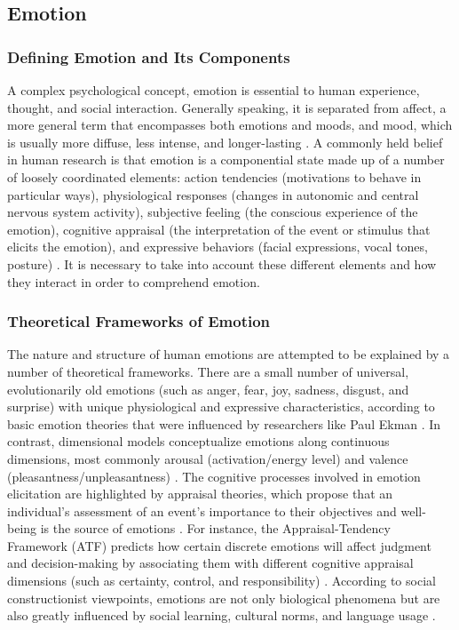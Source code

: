 \documentclass{DESSThesis}
\begin{document}
\subsection{Emotion}

\subsubsection{Defining Emotion and Its Components}
A complex psychological concept, emotion is essential to human experience, thought, and social interaction. Generally speaking, it is separated from affect, a more general term that encompasses both emotions and moods, and mood, which is usually more diffuse, less intense, and longer-lasting \cite{barsade_ripple_2002,lerner_emotion_2015}. A commonly held belief in human research is that emotion is a componential state made up of a number of loosely coordinated elements: action tendencies (motivations to behave in particular ways), physiological responses (changes in autonomic and central nervous system activity), subjective feeling (the conscious experience of the emotion), cognitive appraisal (the interpretation of the event or stimulus that elicits the emotion), and expressive behaviors (facial expressions, vocal tones, posture) \cite{paul_towards_2020,lerner_emotion_2015}. It is necessary to take into account these different elements and how they interact in order to comprehend emotion.

\subsubsection{Theoretical Frameworks of Emotion}
The nature and structure of human emotions are attempted to be explained by a number of theoretical frameworks. There are a small number of universal, evolutionarily old emotions (such as anger, fear, joy, sadness, disgust, and surprise) with unique physiological and expressive characteristics, according to basic emotion theories that were influenced by researchers like Paul Ekman \cite{paul_towards_2020,chang_modeling_2024}. In contrast, dimensional models conceptualize emotions along continuous dimensions, most commonly arousal (activation/energy level) and valence (pleasantness/unpleasantness) \cite{barsade_ripple_2002,nummenmaa_bodily_2014,david_watson_panas-x_1994}. The cognitive processes involved in emotion elicitation are highlighted by appraisal theories, which propose that an individual's assessment of an event's importance to their objectives and well-being is the source of emotions \cite{lerner_emotion_2015}. For instance, the Appraisal-Tendency Framework (ATF) predicts how certain discrete emotions will affect judgment and decision-making by associating them with different cognitive appraisal dimensions (such as certainty, control, and responsibility) \cite{lerner_emotion_2015}. According to social constructionist viewpoints, emotions are not only biological phenomena but are also greatly influenced by social learning, cultural norms, and language usage \cite{mun_science_2022,hochschild_emotion_1979}.
\end{document}
